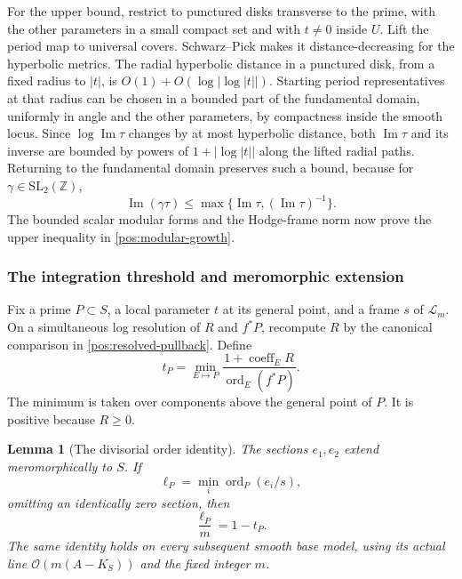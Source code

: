 \documentclass[11pt,letterpaper]{article}
\newcommand{\Z}{\mathbb{Z}}
\newcommand{\OO}{\mathcal{O}}
\DeclareMathOperator{\ord}{ord}
\newtheorem{lemma}[theorem]{Lemma}
\theoremstyle{definition}
\theoremstyle{remark}
\begin{document}
For the upper bound, restrict to punctured disks transverse to the
prime, with the other parameters in a small compact set and with
\(t\ne0\) inside \(U\). Lift the period map to universal covers.
Schwarz--Pick makes it distance-decreasing for the hyperbolic metrics.
The radial hyperbolic distance in a punctured disk, from a fixed
radius to \(|t|\), is
\(O(1)+O(\log|\log|t||)\). Starting period representatives at that
radius can be chosen in a bounded part of the fundamental domain,
uniformly in angle and the other parameters, by compactness inside
the smooth locus. Since \(\log\operatorname{Im}\tau\) changes by
at most hyperbolic distance, both \(\operatorname{Im}\tau\) and its
inverse are bounded by powers of \(1+|\log|t||\) along the lifted
radial paths. Returning to the fundamental domain preserves such a
bound, because for \(\gamma\in\mathrm{SL}_2(\Z)\),
\[
 \operatorname{Im}(\gamma\tau)
 \leq\max\{\operatorname{Im}\tau,(\operatorname{Im}\tau)^{-1}\}.
\]
The bounded scalar modular forms and the Hodge-frame norm now prove
the upper inequality in \eqref{pos:modular-growth}.

\subsubsection{The integration threshold and meromorphic extension}

Fix a prime \(P\subset S\), a local parameter \(t\) at its general
point, and a frame \(s\) of \(\mathcal L_m\). On a simultaneous log
resolution of \(R\) and \(f^*P\), recompute \(R\) by the canonical
comparison in \eqref{pos:resolved-pullback}. Define
\begin{equation}\label{pos:threshold-definition}
 t_P=\min_{E\mapsto P}
 \frac{1+\operatorname{coeff}_E R}{\ord_E(f^*P)}.
\end{equation}
The minimum is taken over components above the general point of
\(P\). It is positive because \(R\geq0\).

\begin{lemma}[The divisorial order identity]\label{pos:order-identity}
The sections \(e_1,e_2\) extend meromorphically to \(S\). If
\[
 \ell_P=\min_i\ord_P(e_i/s),
\]
omitting an identically zero section, then
\begin{equation}\label{pos:modular-order}
 \frac{\ell_P}{m}=1-t_P.
\end{equation}
The same identity holds on every subsequent smooth base model, using
its actual line \(\OO(m(A-K_S))\) and the fixed integer \(m\).
\end{lemma}
\end{document}
